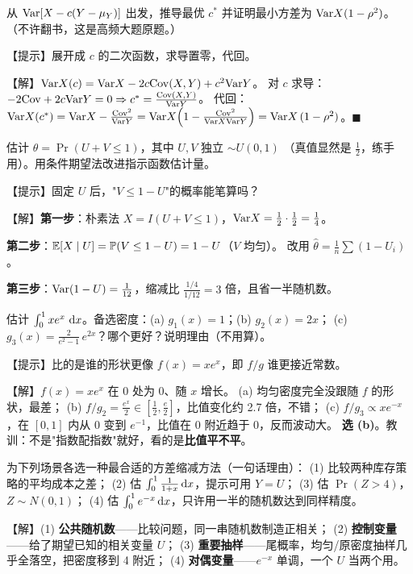 \begin{exbox}[练习 2B（控制变量·推导）]
从 $\mathrm{Var}[X-c(Y-\mu_Y)]$ 出发，推导最优 $c^*$ 并证明最小方差为 $\mathrm{Var} X(1-\rho^2)$。
（不许翻书，这是高频大题原题。）
\end{exbox}
\begin{sol}
【提示】展开成 $c$ 的二次函数，求导置零，代回。

【解】$\mathrm{Var} X(c)=\mathrm{Var} X-2c\mathrm{Cov}(X,Y)+c^2\mathrm{Var} Y$。
对 $c$ 求导：$-2\mathrm{Cov}+2c\mathrm{Var} Y=0\Rightarrow c^*=\frac{\mathrm{Cov}(X,Y)}{\mathrm{Var} Y}$。
代回：
$\mathrm{Var} X(c^*)=\mathrm{Var} X-\frac{\mathrm{Cov}^2}{\mathrm{Var} Y}
=\mathrm{Var} X\Big(1-\frac{\mathrm{Cov}^2}{\mathrm{Var} X\mathrm{Var} Y}\Big)=\mathrm{Var} X\,(1-\rho^2)$。$\blacksquare$
\end{sol}

\begin{exbox}[练习 3（条件期望·描红）]
估计 $\theta=\Pr(U+V\le1)$，其中 $U,V$ 独立 $\sim U(0,1)$
（真值显然是 $\frac12$，练手用）。用条件期望法改进指示函数估计量。
\end{exbox}
\begin{sol}
【提示】固定 $U$ 后，"$ V\le 1-U$"的概率能笔算吗？

【解】\textbf{第一步}：朴素法 $X=I(U+V\le1)$，$\mathrm{Var} X=\frac12\cdot\frac12=\frac14$。

\textbf{第二步}：$\mathbb{E}[X\mid U]=\mathbb{P}(V\le1-U)=1-U$（$V$ 均匀）。
改用 $\hat\theta=\frac1n\sum(1-U_i)$。

\textbf{第三步}：$\mathrm{Var}(1-U)=\frac1{12}$，缩减比 $\frac{1/4}{1/12}=3$ 倍，且省一半随机数。
\end{sol}

\begin{exbox}
估计 $\int_0^1 x e^x\,\,\mathrm{d} x$。备选密度：(a) $g_1(x)=1$；(b) $g_2(x)=2x$；
(c) $g_3(x)=\frac{2}{e^2-1}\,e^{2x}$？哪个更好？说明理由（不用算）。
\end{exbox}
\begin{sol}
【提示】比的是谁的形状更像 $f(x)=xe^x$，即 $f/g$ 谁更接近常数。

【解】$f(x)=xe^x$ 在 0 处为 0、随 $x$ 增长。
(a) 均匀密度完全没跟随 $f$ 的形状，最差；
(b) $f/g_2=\frac{e^x}{2}\in[\frac12,\frac e2]$，比值变化约 2.7 倍，不错；
(c) $f/g_3\propto x e^{-x}$，在 $[0,1]$ 内从 0 变到 $e^{-1}$，比值在 0 附近趋于 0，反而波动大。
\textbf{选 (b)}。教训：不是"指数配指数"就好，看的是\textbf{比值平不平}。
\end{sol}

\begin{exbox}
为下列场景各选一种最合适的方差缩减方法（一句话理由）：
(1) 比较两种库存策略的平均成本之差；
(2) 估 $\int_0^1\frac{1}{1+x}\,\mathrm{d} x$，提示可用 $Y=U$；
(3) 估 $\Pr(Z>4)$，$Z\sim N(0,1)$；
(4) 估 $\int_0^1 e^{-x}\,\mathrm{d} x$，只许用一半的随机数达到同样精度。
\end{exbox}
\begin{sol}
【解】(1) \textbf{公共随机数}——比较问题，同一串随机数制造正相关；
(2) \textbf{控制变量}——给了期望已知的相关变量 $U$；
(3) \textbf{重要抽样}——尾概率，均匀/原密度抽样几乎全落空，把密度移到 4 附近；
(4) \textbf{对偶变量}——$e^{-x}$ 单调，一个 $U$ 当两个用。
\end{sol}

